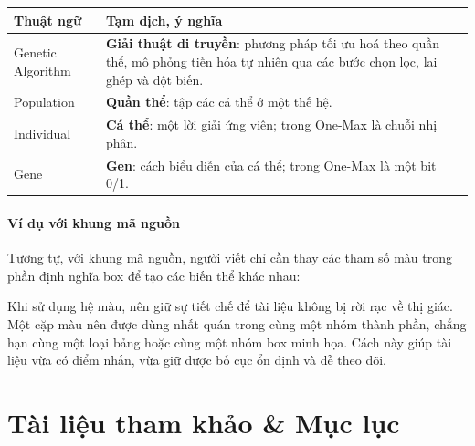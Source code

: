 \documentclass[12pt]{ai_conquer2026}
\begin{document}
\begin{tcolorbox}[
  colframe=aivnGreen,
  colbacktitle=aivnGreen,
  colback=white,
  boxrule=1pt,
  title=\textbf{Bảng thuật ngữ (aivnGreen \& green!12!white)},
  fonttitle=\bfseries\color{white},
  halign title=center,
  arc=5pt
]
\renewcommand{\arraystretch}{1.5}
\renewcommand{\tabularxcolumn}[1]{m{#1}}
\begin{tabularx}{\linewidth}{>{\centering\arraybackslash}m{3.0cm} X}
  \textbf{Thuật ngữ} & \textbf{Tạm dịch, ý nghĩa} \\
  \midrule
  Genetic Algorithm & \textbf{Giải thuật di truyền}: phương pháp tối ưu hoá theo quần thể, mô phỏng tiến hóa tự nhiên qua các bước chọn lọc, lai ghép và đột biến. \\
  Population & \textbf{Quần thể}: tập các cá thể ở một thế hệ. \\
  Individual & \textbf{Cá thể}: một lời giải ứng viên; trong One-Max là chuỗi nhị phân. \\
  Gene & \textbf{Gen}: cách biểu diễn của cá thể; trong One-Max là một bit 0/1. \\
\end{tabularx}
\end{tcolorbox}

\paragraph{Ví dụ với khung mã nguồn}

Tương tự, với khung mã nguồn, người viết chỉ cần thay các tham số màu trong phần định nghĩa box để tạo các biến thể khác nhau:


Khi sử dụng hệ màu, nên giữ sự tiết chế để tài liệu không bị rời rạc về thị giác. Một cặp màu nên được dùng nhất quán trong cùng một nhóm thành phần, chẳng hạn cùng một loại bảng hoặc cùng một nhóm box minh họa. Cách này giúp tài liệu vừa có điểm nhấn, vừa giữ được bố cục ổn định và dễ theo dõi.

\newpage
\section{Tài liệu tham khảo \& Mục lục}
\end{document}
